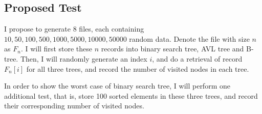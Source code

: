 \documentclass{article}
\begin{document}
\begin{spacing}{1.2}
\section{Proposed Test}
I propose to generate $8$ files, each containing $10, 50, 100, 500, 1000, 5000, 10000, 50000$ random data. Denote the file with size $n$ as $F_n$. I will first store these $n$ records into binary search tree, AVL tree and B- tree. Then, I will randomly generate an index $i$, and do a retrieval of record $F_n[i]$ for all three trees, and record the number of visited nodes in each tree.

In order to show the worst case of binary search tree, I will perform one additional test, that is, store 100 sorted elements in these three trees, and record their corresponding number of visited nodes.

\end{spacing}
\end{document}
